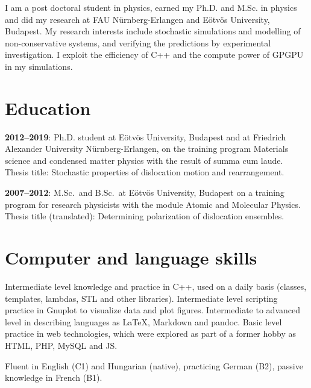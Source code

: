 \documentclass[11pt,a4paper,sans]{moderncv}        %
\begin{document}
\makecvtitle
I am a post doctoral student in physics, earned my Ph.D. and M.Sc. in physics and did my research at FAU Nürnberg-Erlangen and Eötvös University, Budapest. My research interests include stochastic simulations and modelling of non-conservative systems, and verifying the predictions by experimental investigation. I exploit the efficiency of C++ and the compute power of GPGPU in my simulations.\vspace{0.5em}

\section{Education}
\textbf{2012--2019}: Ph.D. student at Eötvös University, Budapest and at Friedrich Alexander University Nürnberg-Erlangen, on the training program Materials science and condensed matter physics with the result of summa cum laude. Thesis title: Stochastic properties of dislocation motion and rearrangement.  %

\textbf{2007--2012}: M.Sc.\ and B.Sc.\ at Eötvös University, Budapest on a training program for research physicists with the module Atomic and Molecular Physics. Thesis title (translated): Determining polarization of dislocation ensembles.

\section{Computer and language skills}
Intermediate level knowledge and practice in C++, used on a daily basis (classes, templates, lambdas, STL and other libraries). Intermediate level scripting practice in Gnuplot to visualize data and plot figures. Intermediate to advanced level in describing languages as LaTeX, Markdown and pandoc. Basic level practice in web technologies, which were explored as part of a former hobby as HTML, PHP, MySQL and JS.

Fluent in English (C1) and Hungarian (native), practicing German (B2), passive knowledge in French (B1).
\end{document}
